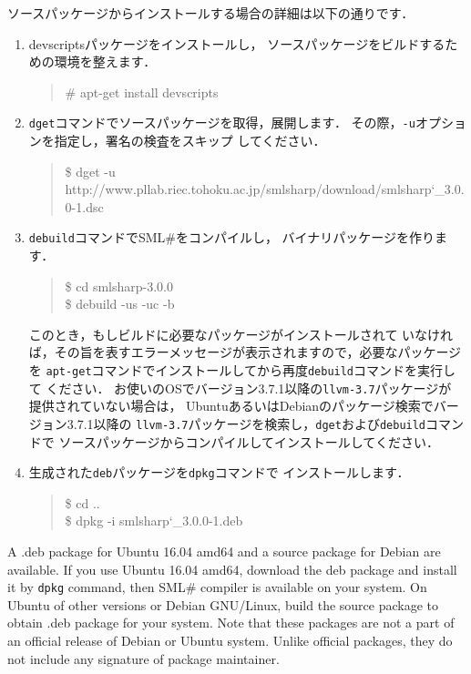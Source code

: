 \documentclass{jbook}
\newcommand{\smlsharp}{SML\#}
\newcommand{\version}{3.0.0}
\newenvironment{program}{\begin{quote}\begin{tt}}%
                        {\end{tt}\end{quote}}
\begin{document}
	ソースパッケージからインストールする場合の詳細は以下の通りです．
\begin{enumerate}
\item
	devscriptsパッケージをインストールし，
ソースパッケージをビルドするための環境を整えます．
\begin{program}
\# apt-get install devscripts
\end{program}
\item
	{\tt dget}コマンドでソースパッケージを取得，展開します．
	その際，{\tt -u}オプションを指定し，署名の検査をスキップ
してください．
\begin{program}
\$ dget -u http://www.pllab.riec.tohoku.ac.jp/smlsharp/download/smlsharp\char`\_\version-1.dsc
\end{program}
\item
	{\tt debuild}コマンドで\smlsharp{}をコンパイルし，
バイナリパッケージを作ります．
\begin{program}
\$ cd smlsharp-\version\\
\$ debuild -us -uc -b
\end{program}
	このとき，もしビルドに必要なパッケージがインストールされて
いなければ，その旨を表すエラーメッセージが表示されますので，必要なパッケージを
{\tt apt-get}コマンドでインストールしてから再度{\tt debuild}コマンドを実行して
ください．
	お使いのOSでバージョン3.7.1以降の{\tt llvm-3.7}パッケージが
提供されていない場合は，
UbuntuあるいはDebianのパッケージ検索でバージョン3.7.1以降の
{\tt llvm-3.7}パッケージを検索し，{\tt dget}および{\tt debuild}コマンドで
ソースパッケージからコンパイルしてインストールしてください．
\item
	生成された{\tt deb}パッケージを{\tt dpkg}コマンドで
インストールします．
\begin{program}
\$ cd ..\\
\$ dpkg -i smlsharp\char`\_\version-1.deb
\end{program}
\end{enumerate}

\else%

	A \mbox{.deb} package for Ubuntu 16.04 amd64 and
a source package for Debian are available.
	If you use Ubuntu 16.04 amd64, download the \mbox{deb} package
and install it by {\tt dpkg} command, then 
\smlsharp{} compiler is available on your system.
	On Ubuntu of other versions or Debian GNU/Linux, build the
source package to obtain \mbox{.deb} package for your system.
	Note that these packages are not a part of an official
release of Debian or Ubuntu system.
	Unlike official packages, they do not include any signature of
package maintainer.
\end{document}
